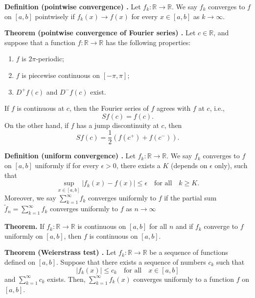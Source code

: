 \begin{shaded}
\textbf{Definition (pointwise convergence) \cite{math2111_notes}.} Let $f_k : \mathbb{R} \to \mathbb{R}$. We say $f_k$ converges to $f$ on $[a, b]$ pointwisely if $f_k(x) \to f(x)$ for every $x \in [a, b]$ as $k \to \infty$.
\end{shaded}

\begin{shaded}
\textbf{Theorem (pointwise convergence of Fourier series) \cite{math2111_notes}.} Let $c \in \mathbb{R}$, and suppose that a function $f : \mathbb{R} \to \mathbb{R}$ has the following properties:
\begin{enumerate}
	\item $f$ is $2 \pi$-periodic;
	\item $f$ is piecewise continuous on $[-\pi, \pi]$;
	\item $D^+ f(c)$ and $D^- f(c)$ exist.
\end{enumerate}
If $f$ is continuous at $c$, then the Fourier series of $f$ agrees with $f$ at $c$, i.e.,
$$ S f(c) = f(c) . $$
On the other hand, if $f$ has a jump discontinuity at $c$, then
$$ S f(c) = \frac{1}{2} \left( f(c^+) + f(c^-) \right) . $$
\end{shaded}

\begin{shaded}
\textbf{Definition (uniform convergence) \cite{math2111_notes}.} Let $f_k : \mathbb{R} \to \mathbb{R}$. We say $f_k$ converges to $f$ on $[a, b]$ uniformly if for every $\epsilon > 0$, there exists a $K$ (depends on $\epsilon$ only), such that
$$ \sup_{x \in [a, b]} | f_k(x) - f(x) | \leq \epsilon \quad \text{for all} \quad k \geq K . $$
Moreover, we say $\sum_{k = 1}^{\infty} f_k$ converges uniformly to $f$ if the partial sum $\tilde{f}_n = \sum_{k = 1}^{\infty} f_k$ converges uniformly to $f$ as $n \to \infty$

\textbf{Theorem.} If $f_k : \mathbb{R} \to \mathbb{R}$ is continuous on $[a, b]$ for all $n$ and if $f_k$ converge to $f$ uniformly on $[a, b]$, then $f$ is continuous on $[a, b]$.
\end{shaded}

\begin{shaded}
\textbf{Theorem (Weierstrass test) \cite{math2111_notes}.} Let $f_k : \mathbb{R} \to \mathbb{R}$ be a sequence of functions defined on $[a, b]$. Suppose that there exists a sequence of numbers $c_k$ such that
$$ |f_k(x)| \leq c_k \quad \text{for all} \quad x \in [a, b] $$
and $\sum_{k = 1}^\infty c_k$ exists. Then, $\sum_{k = 1}^\infty f_k(x)$ converges uniformly to a function $f$ on $[a, b]$.
\end{shaded}

